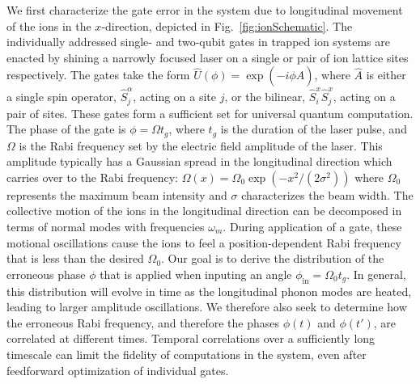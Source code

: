 \documentclass[prx,aps,twocolumn,showpacs,superscriptaddress,10pt]{revtex4-1}
\begin{document}
We first characterize the gate error in the system due to longitudinal movement of the ions in the $x$-direction, depicted in Fig.~\ref{fig:ionSchematic}. The individually addressed single- and two-qubit gates in trapped ion systems are enacted by shining a narrowly focused laser on a single or pair of ion lattice sites respectively. The gates take the form $\hat{U}\left(\phi\right)=\exp\left(-i\phi\hat{A}\right)$, where $\hat{A}$ is either a single spin operator, $\hat{S}_{j}^{\alpha}$, acting on a site $j$, or the bilinear, $\hat{S}_{i}^{x}\hat{S}_{j}^{x}$, acting on a pair of sites. These gates form a sufficient set for universal quantum computation. The phase of the gate is $\phi=\Omega t_{g}$, where $t_{g}$ is the duration of the laser pulse, and $\Omega$ is the Rabi frequency set by the electric field amplitude of the laser. This amplitude typically has a Gaussian spread in the longitudinal direction which carries over to the Rabi frequency: $\Omega\left(x\right)=\Omega_{0}\exp\left(-x^{2}/(2\sigma^2)\right)$ where $\Omega_{0}$ represents the maximum beam intensity and $\sigma$ characterizes the beam width. The collective motion of the ions in the longitudinal direction can be  decomposed in terms of normal modes with frequencies $\omega_{m}$. During application of a gate, these motional oscillations cause the ions to feel a position-dependent Rabi frequency that is less than the desired $\Omega_{0}$. Our goal is to derive the distribution of the erroneous phase $\phi$ that is applied when inputing an angle $\phi_\textrm{in}=\Omega_{0}t_{g}$. In general, this distribution will evolve in time as the longitudinal phonon modes are heated, leading to larger amplitude oscillations. We therefore also seek to determine how the erroneous Rabi frequency, and therefore the phases $\phi(t)$ and $\phi(t')$, are correlated at different times. Temporal correlations over a sufficiently long timescale can limit the fidelity of computations in the system, even after feedforward optimization of individual gates.
\end{document}
